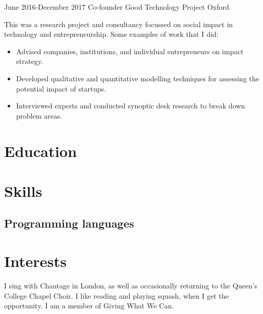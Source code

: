 \documentclass[12pt,a4paper,sans]{moderncv}
\begin{document}
\cventry
{June 2016-December 2017}
{Co-founder}
{Good Technology Project}
{Oxford}
{}
{
  This was a research project and consultancy focussed on social impact in technology and
  entrepreneurship. Some examples of work that I did:
  \begin{itemize}
    \item Advised companies, institutions, and individual entrepreneurs on impact strategy.
    \item Developed qualitative and quantitative modelling techniques for
      assessing the potential impact of startups.
    \item Interviewed experts and conducted synoptic desk research to break down problem areas.
  \end{itemize}
}

\nocite{*}
\printbibliography[title={Publications}]

\section{Education}

\section{Skills}

\subsection{Programming languages}


\section{Interests}
I sing with Chantage in London, as well as occasionally returning to the Queen's
College Chapel Choir. I like reading and playing squash, when I get the
opportunity. I am a member of Giving What We Can.
\end{document}
